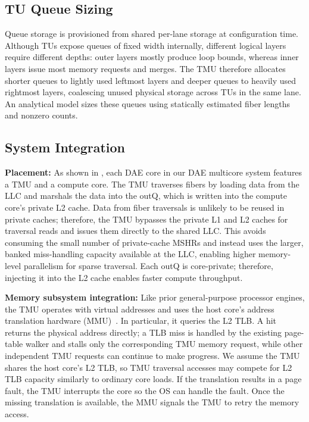 \subsection{TU Queue Sizing} \label{sec:tmu-queue-sizing} %

Queue storage is provisioned from shared per-lane storage at configuration time. Although TUs expose queues of fixed width internally, different logical layers require different depths: outer layers mostly produce loop bounds, whereas inner layers issue most memory requests and merges. The TMU therefore allocates shorter queues to lightly used leftmost layers and deeper queues to heavily used rightmost layers, coalescing unused physical storage across TUs in the same lane. An analytical model sizes these queues using statically estimated fiber lengths and nonzero counts.

\subsection{System Integration} \label{sec:tmu-system-integration} %

\noindent\textbf{Placement:} 
As shown in , each DAE core in our DAE multicore system features a TMU and a compute core. The TMU traverses fibers by loading data from the LLC and marshals the data into the outQ, which is written into the compute core's private L2 cache. Data from fiber traversals is unlikely to be reused in private caches; therefore, the TMU bypasses the private L1 and L2 caches for traversal reads and issues them directly to the shared LLC. This avoids consuming the small number of private-cache MSHRs and instead uses the larger, banked miss-handling capacity available at the LLC, enabling higher memory-level parallelism for sparse traversal. Each outQ is core-private; therefore, injecting it into the L2 cache enables faster compute throughput.

\noindent\textbf{Memory subsystem integration:} 
Like prior general-purpose processor engines, the TMU operates with virtual addresses and uses the host core's address translation hardware (MMU)~\cite{yang2021isca, kocberber2013micro, jones2016sc, mukkara2018micro, yu2015micro}. In particular, it queries the L2 TLB. A hit returns the physical address directly; a TLB miss is handled by the existing page-table walker and stalls only the corresponding TMU memory request, while other independent TMU requests can continue to make progress. We assume the TMU shares the host core's L2 TLB, so TMU traversal accesses may compete for L2 TLB capacity similarly to ordinary core loads. If the translation results in a page fault, the TMU interrupts the core so the OS can handle the fault. Once the missing translation is available, the MMU signals the TMU to retry the memory access.

